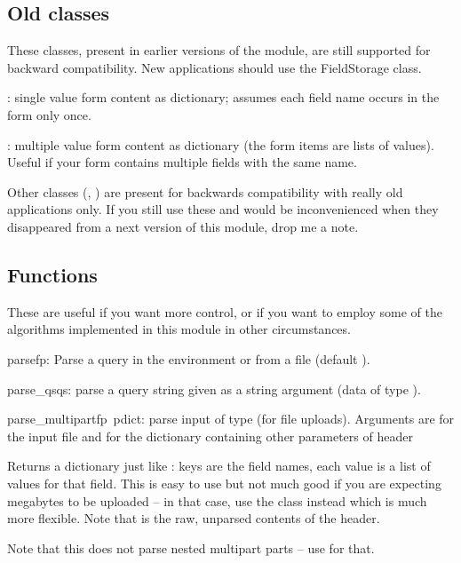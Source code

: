\subsection{Old classes}

These classes, present in earlier versions of the  module, are still 
supported for backward compatibility.  New applications should use the
FieldStorage class.

: single value form content as dictionary; assumes each 
field name occurs in the form only once.

: multiple value form content as dictionary (the form
items are lists of values).  Useful if your form contains multiple
fields with the same name.

Other classes (, ) are present for
backwards compatibility with really old applications only.  If you still 
use these and would be inconvenienced when they disappeared from a next 
version of this module, drop me a note.


\subsection{Functions}

These are useful if you want more control, or if you want to employ
some of the algorithms implemented in this module in other
circumstances.

\begin{funcdesc}{parse}{fp}: Parse a query in the environment or from a file (default ).
\end{funcdesc}

\begin{funcdesc}{parse_qs}{qs}: parse a query string given as a string argument (data of type 
).
\end{funcdesc}

\begin{funcdesc}{parse_multipart}{fp\, pdict}: parse input of type  (for 
file uploads).  Arguments are  for the input file and 
     for the dictionary containing other parameters of  header

    Returns a dictionary just like : keys are the field names, each 
    value is a list of values for that field.  This is easy to use but not 
    much good if you are expecting megabytes to be uploaded -- in that case, 
    use the  class instead which is much more flexible.  Note 
    that  is the raw, unparsed contents of the  
    header.

    Note that this does not parse nested multipart parts -- use  for 
    that.
\end{funcdesc}

